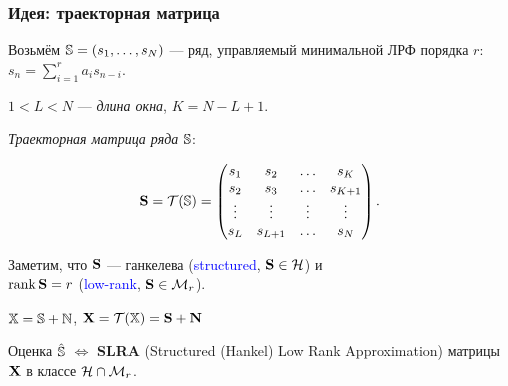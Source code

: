 \documentclass[unicode, notheorems]{beamer}
\newtheorem{definition}{Определение}
\DeclareMathOperator{\rank}{rank}
\begin{document}
\begin{frame}
	\frametitle{Идея: траекторная матрица}
	Возьмём $\mathbb{S} = (s_1, \ldots, s_N)$ --- ряд, управляемый минимальной ЛРФ порядка $r$: $ s_n = \sum_{i = 1}^{r} a_i s_{n-i}$.
	
	$1 < L < N$ --- \emph{длина окна}, $K = N - L + 1$.
	
	\emph{Траекторная матрица ряда} $\mathbb{S}$:
	
	\begin{equation*}
	\mathbf{S} = \mathcal{T}(\mathbb{S}) = \begin{pmatrix}
	s_1 & s_2 & \ldots & s_K \\
	s_2 & s_3 & \ldots & s_{K + 1} \\
	\vdots & \vdots & \vdots & \vdots \\
	s_L & s_{L + 1} & \ldots & s_N
	\end{pmatrix}.
	\end{equation*}
	
	Заметим, что $\mathbf{S}$ --- ганкелева (\textcolor{blue}{structured}, $\mathbf{S} \in \mathcal{H}$) и \\ $\rank \bfS = r$ (\textcolor{blue}{low-rank}, $\mathbf{S} \in \mathcal{M}_r$). 
	
	$\mathbb{X} = \mathbb{S} + \mathbb{N}$, $\mathbf{X} = \mathcal{T}(\mathbb{X}) = \mathbf{S} + \mathbf{N}$
	
	Оценка $\hat {\mathbb{S}}$ $\Leftrightarrow$ \textbf{SLRA} (Structured (Hankel) Low Rank Approximation) матрицы $\mathbf{X}$ в классе $\mathcal{H} \cap \mathcal{M}_r$.
	
	
	
	
	
	
\end{frame}
\end{document}

